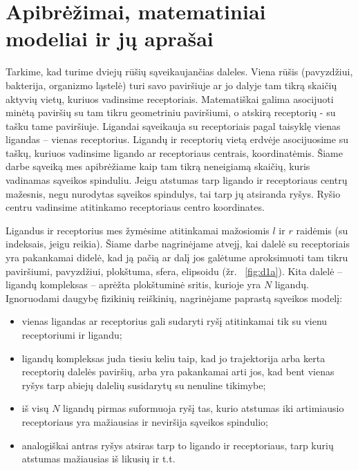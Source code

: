 \documentclass[10pt]{article}
\begin{document}
\section{Apibrėžimai, matematiniai modeliai ir jų aprašai}

Tarkime, kad turime dviejų rūšių sąveikaujančias daleles. Viena rūšis (pavyzdžiui, bakterija, organizmo ląstelė) turi savo paviršiuje ar jo dalyje tam tikrą skaičių aktyvių vietų, kuriuos  vadinsime receptoriais. Matematiškai galima asocijuoti minėtą paviršių su tam tikru geometriniu paviršiumi, o atskirą receptorių -  su tašku tame paviršiuje. Ligandai  sąveikauja su receptoriais pagal taisyklę vienas ligandas – vienas receptorius.  Ligandų ir receptorių vietą erdvėje asocijuosime su taškų, kuriuos vadinsime ligando ar receptoriaus centrais, koordinatėmis. Šiame darbe sąveiką mes apibrėžiame kaip tam tikrą neneigiamą skaičių, kuris vadinamas sąveikos spinduliu. Jeigu atstumas tarp ligando ir receptoriaus centrų mažesnis, negu nurodytas sąveikos spindulys, tai tarp jų atsiranda ryšys. Ryšio centru vadinsime atitinkamo receptoriaus centro koordinates.

Ligandus ir receptorius mes žymėsime atitinkamai  mažosiomis  $l$ ir $r$ raidėmis (su indeksais, jeigu reikia). Šiame darbe  nagrinėjame atvejį, kai dalelė su receptoriais yra pakankamai didelė, kad  ją pačią  ar  dalį jos  galėtume aproksimuoti tam tikru paviršiumi, pavyzdžiui,  plokštuma, sfera, elipsoidu (žr. ~\ref{fig:d1a}).  Kita dalelė – ligandų kompleksas –  aprėžta plokštuminė sritis, kurioje yra $ N $  ligandų. Ignoruodami daugybę fizikinių  reiškinių, nagrinėjame paprastą  sąveikos  modelį: 
\begin{itemize}

\item vienas ligandas ar receptorius gali sudaryti ryšį atitinkamai tik su vienu receptoriumi ir ligandu;

\item   ligandų kompleksas juda tiesiu keliu taip, kad jo trajektorija arba kerta receptorių dalelės paviršių, arba yra pakankamai arti jos, kad bent vienas ryšys tarp abiejų dalelių susidarytų  su nenuline tikimybe;

\item iš visų $N$ ligandų pirmas suformuoja ryšį tas, kurio atstumas iki artimiausio receptoriaus yra  mažiausias ir neviršija sąveikos spindulio;

\item  analogiškai antras ryšys atsiras tarp to ligando ir receptoriaus, tarp kurių atstumas mažiausias iš likusių ir t.t.  
\end{itemize}
               
\end{document}
